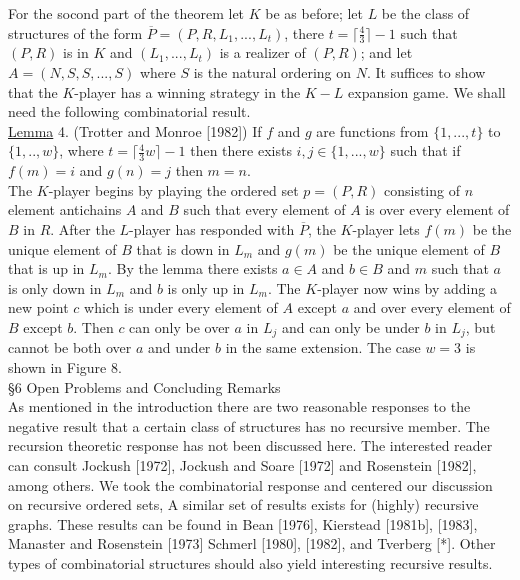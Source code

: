 \documentclass[twoside]{article}
\begin{document}
For the socond part of the theorem let $K$ be as before; let $L$ be the class of structures
of the form $\overline{P}=(P,R,L_1,...,L_t)$, there $t=\lceil \frac 4 3\rceil - 1$ such that
$(P,R)$ is in $K$ and $(L_1,...,L_t)$ is a realizer of $(P,R)$; and let $A=(N,S,S,...,S)$
where $S$ is the natural ordering on $N$. It suffices to show that the $K$-player has a winning
strategy in the $K-L$ expansion game. We shall need the following combinatorial result.\\
\newline
\underline{Lemma} 4. (Trotter and Monroe [1982]) If $f$ and $g$ are functions from $\{1,...,t\}$
to $\{1,..,w\}$, where $t = \lceil {\frac 4 3}w \rceil - 1$ then there exists $i,j \in \{1,...,w\}$
such that if $f(m) = i$ and $g(n) = j$ then $m=n$.\\

The $K$-player begins by playing the ordered set $p=(P,R)$ consisting of $n$ element antichains
$A$ and $B$ such that every element of $A$ is over every element of $B$ in $R$. After the $L$-player
has responded with $\overline{P}$, the $K$-player lets $f(m)$ be the unique element of $B$
that is down in $L_m$ and $g(m)$ be the unique element of $B$ that is up in $L_m$. By the lemma there exists
$a \in A$ and $b \in B$ and $m$ such that $a$ is only down in $L_m$ and $b$ is only up in $L_m$.
The $K$-player now wins by adding a new point $c$ which is under every element of $A$ except
$a$ and over every element of $B$ except $b$. Then $c$ can only be over $a$ in $L_j$ and can only be under
$b$ in $L_j$, but cannot be both over $a$ and under $b$ in the same extension. The case
$w=3$ is shown in Figure 8.\\
%
%


\noindent\S 6 Open Problems and Concluding Remarks\\


As mentioned in the introduction there are two reasonable responses to the negative result that
a certain class of structures has no recursive member. The recursion theoretic response has not
been discussed here. The interested reader can consult Jockush [1972], Jockush and Soare [1972]
and Rosenstein [1982], among others. We took the combinatorial response and centered our discussion on recursive
ordered sets, A similar set of results exists for (highly) recursive graphs. These results can be found in Bean [1976],
Kierstead [1981b], [1983], Manaster and Rosenstein [1973] Schmerl [1980], [1982], and Tverberg [*].
Other types of combinatorial structures should also yield interesting recursive results.\\
\end{document}
